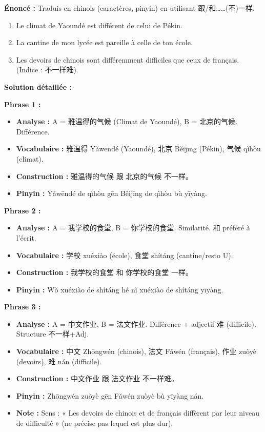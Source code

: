 \documentclass[11pt]{article}
\newcommand{\cle}[1]{{\popxbold\color{popdark}#1}}
\begin{document}
\begin{exoresolu}
\textbf{Énoncé :} Traduis en chinois (caractères, pinyin) en utilisant \cle{跟/和……(不)一样}.
\begin{enumerate}
    \item Le climat de Yaoundé est différent de celui de Pékin.
    \item La cantine de mon lycée est pareille à celle de ton école.
    \item Les devoirs de chinois sont différemment difficiles que ceux de français. (Indice : \cle{不一样难}).
\end{enumerate}

\tcblower
\textbf{Solution détaillée :}

\textbf{Phrase 1 :}
\begin{itemize}
    \item \textbf{Analyse :} A = \cle{雅温得的气候} (Climat de Yaoundé), B = \cle{北京的气候}. Différence.
    \item \textbf{Vocabulaire :} 雅温得 \cle{Yǎwēndé} (Yaoundé), 北京 \cle{Běijīng} (Pékin), 气候 \cle{qìhòu} (climat).
    \item \textbf{Construction :} \cle{雅温得的气候 跟 北京的气候 不一样。}
    \item \textbf{Pinyin :} Yǎwēndé de qìhòu gēn Běijīng de qìhòu bù yīyàng.
\end{itemize}

\textbf{Phrase 2 :}
\begin{itemize}
    \item \textbf{Analyse :} A = \cle{我学校的食堂}, B = \cle{你学校的食堂}. Similarité. \cle{和} préféré à l'écrit.
    \item \textbf{Vocabulaire :} 学校 \cle{xuéxiào} (école), 食堂 \cle{shítáng} (cantine/resto U).
    \item \textbf{Construction :} \cle{我学校的食堂 和 你学校的食堂 一样。}
    \item \textbf{Pinyin :} Wǒ xuéxiào de shítáng hé nǐ xuéxiào de shítáng yīyàng.
\end{itemize}

\textbf{Phrase 3 :}
\begin{itemize}
    \item \textbf{Analyse :} A = \cle{中文作业}, B = \cle{法文作业}. Différence + adjectif \cle{难} (difficile). Structure \cle{不一样+Adj}.
    \item \textbf{Vocabulaire :} 中文 \cle{Zhōngwén} (chinois), 法文 \cle{Fǎwén} (français), 作业 \cle{zuòyè} (devoirs), 难 \cle{nán} (difficile).
    \item \textbf{Construction :} \cle{中文作业 跟 法文作业 不一样难。}
    \item \textbf{Pinyin :} Zhōngwén zuòyè gēn Fǎwén zuòyè bù yīyàng nán.
    \item \textbf{Note :} Sens : « Les devoirs de chinois et de français diffèrent par leur niveau de difficulté » (ne précise pas lequel est plus dur).
\end{itemize}
\end{exoresolu}
\end{document}
